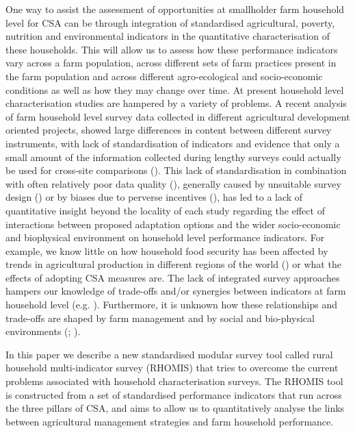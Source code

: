 One way to assist the assessment of opportunities at smallholder farm household level for CSA can be through integration of standardised agricultural, poverty, nutrition and environmental indicators in the quantitative characterisation of these households. This will allow us to assess how these performance indicators vary across a farm population, across different sets of farm practices present in the farm population and across different agro-ecological and socio-economic conditions as well as how they may change over time. At present household level characterisation studies are hampered by a variety of problems. A recent analysis of farm household level survey data collected in different agricultural development oriented projects, showed large differences in content between different survey instruments, with lack of standardisation of indicators and evidence that only a small amount of the information collected during lengthy surveys could actually be used for cross-site comparisons (\citealp{Frelat2016458}). This lack of standardisation in combination with often relatively poor data quality (\citealp{Tiffen2003}), generally caused by unsuitable survey design (\citealp{Randall2015162}) or by biases due to perverse incentives (\citealp{Sandefur2015116}), has led to a lack of quantitative insight beyond the locality of each study regarding the effect of interactions between proposed adaptation options and the wider socio-economic and biophysical environment on household level performance indicators. For example, we know little on how household food security has been affected by trends in agricultural production in different regions of the world (\citealp{Carletto2013}) or what the effects of adopting CSA measures are. The lack of integrated survey approaches hampers our knowledge of trade-offs and/or synergies between indicators at farm household level (e.g. \citealp{Klapwijk2014110}). Furthermore, it is unknown how these relationships and trade-offs are shaped by farm management and by social and bio-physical environments (\citealp{Carletto2015133}; \citealp{DeWeerdt201536}).

In this paper we describe a new standardised modular survey tool called rural household multi-indicator survey (RHOMIS) that tries to overcome the current problems associated with household characterisation surveys. The RHOMIS tool is constructed from a set of
standardised performance indicators that run across the three pillars of CSA, and aims to allow us to quantitatively analyse the links between agricultural management strategies and farm household performance.


